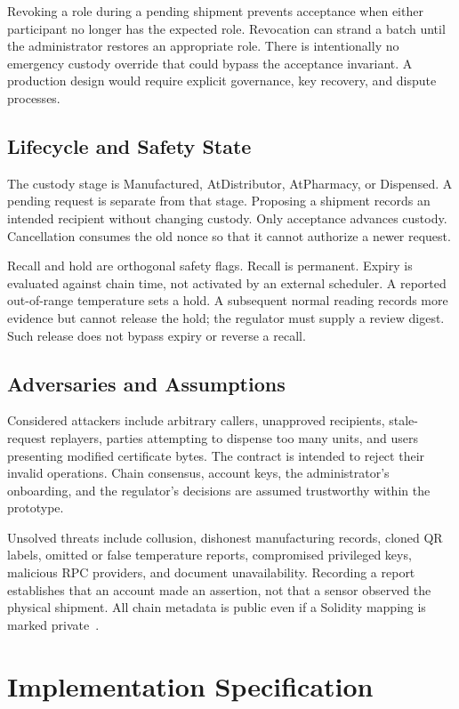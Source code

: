 Revoking a role during a pending shipment prevents acceptance when either participant no longer has the expected role. Revocation can strand a batch until the administrator restores an appropriate role. There is intentionally no emergency custody override that could bypass the acceptance invariant. A production design would require explicit governance, key recovery, and dispute processes.

\subsection{Lifecycle and Safety State}
The custody stage is Manufactured, AtDistributor, AtPharmacy, or Dispensed. A pending request is separate from that stage. Proposing a shipment records an intended recipient without changing custody. Only acceptance advances custody. Cancellation consumes the old nonce so that it cannot authorize a newer request.

Recall and hold are orthogonal safety flags. Recall is permanent. Expiry is evaluated against chain time, not activated by an external scheduler. A reported out-of-range temperature sets a hold. A subsequent normal reading records more evidence but cannot release the hold; the regulator must supply a review digest. Such release does not bypass expiry or reverse a recall.

\subsection{Adversaries and Assumptions}
Considered attackers include arbitrary callers, unapproved recipients, stale-request replayers, parties attempting to dispense too many units, and users presenting modified certificate bytes. The contract is intended to reject their invalid operations. Chain consensus, account keys, the administrator's onboarding, and the regulator's decisions are assumed trustworthy within the prototype.

Unsolved threats include collusion, dishonest manufacturing records, cloned QR labels, omitted or false temperature reports, compromised privileged keys, malicious RPC providers, and document unavailability. Recording a report establishes that an account made an assertion, not that a sensor observed the physical shipment. All chain metadata is public even if a Solidity mapping is marked private~\cite{solidity}.

\section{Implementation Specification}
